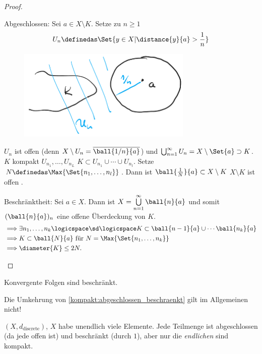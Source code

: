 \begin{proof}
    \begin{proofdescription}
        \item[Abgeschlossen:] Sei \( a\in X\setminus K\). Setze zu \( n\geq 1\)
        \begin{align*}
            U_n\definedas \Set{y\in X| \distance{y}{a}>\frac{1}{n}}
        \end{align*}  
        \begin{figure}[H]
            \centering
            \includegraphics[width=0.5\linewidth]{figures/kompakt_abgeschlossen_beweis}
            \label{fig:kompakt_abgeschlossen_beweis}
        \end{figure}
        \( U_n\) ist offen (denn \( X\setminus U_n=\overline{\ball{1/n}{a}}\)) und \( \bigcup_{n=1}^{\infty}U_n=X\setminus \Set{a}\supset K\).
        \( K\) kompakt \timplies \texists \( U_{n_1},\ldots, U_{n_L}\) \sd \( K\subset U_{n_1}\cup \cdots \cup U_{n_l}\). Setze \( N\definedas \Max{\Set{n_1,\ldots,n_l}}\). Dann ist \( \ball{\frac{1}{N}}{a}\subset X\setminus K\) \timplies \( X\setminus K \) ist offen \timplies \Beh.
        
        \item[Beschränktheit:] Sei \( a\in X\). Dann ist \( X=\bigcup\limits_{n=1}^{\infty} \ball{n}{a} \) und somit \( (\ball{n}{a})_n\) eine offene Überdeckung von \( K\).
        \begin{align*}
            \implies &\exists n_1,\ldots, n_k\logicspace\text{\sd}\logicspace  K\subset \ball{n-1}{a}\cup \cdots \ball{n_k}{a}\\
            \implies &K\subset \ball{N}{a} \text{ für }N=\Max{\Set{n_1,\ldots,n_k}}\\
            \implies &\diameter{K}\leq 2N.
        \end{align*}     
    \end{proofdescription}    
\end{proof}
\begin{folgerung*}
    Konvergente Folgen sind beschränkt.
\end{folgerung*}
\begin{bemerkung*}
    Die Umkehrung von \ref{kompakt:abgeschlossen_beschraenkt} gilt im Allgemeinen nicht!
    
    \( (X,d_{\text{discrete}})\), \( X\) habe unendlich viele Elemente. Jede Teilmenge ist abgeschlossen (da jede offen ist) und beschränkt (durch \( 1\)), aber nur die \emph{endlichen} sind kompakt.
\end{bemerkung*}
